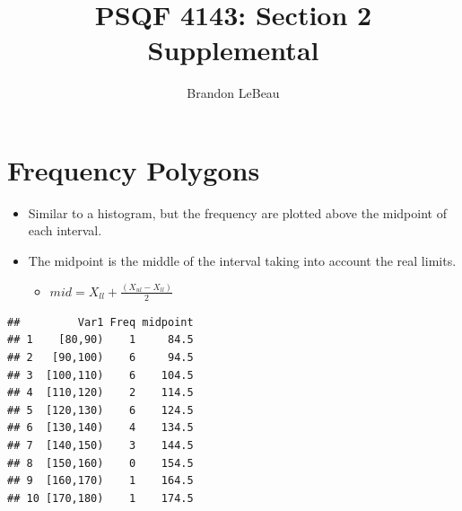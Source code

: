 \documentclass[12pt]{article}
\title{PSQF 4143: Section 2 Supplemental}
\author{Brandon LeBeau}
\date{}
\begin{document}
\maketitle

\section{Frequency Polygons}\label{frequency-polygons}

\begin{itemize}
\itemsep1pt\parskip0pt
\item
  Similar to a histogram, but the frequency are plotted above the
  midpoint of each interval.
\item
  The midpoint is the middle of the interval taking into account the
  real limits.

  \begin{itemize}
  \itemsep1pt\parskip0pt
  \item
    \(mid = X_{ll} + \frac{(X_{ul} - X_{ll})}{2}\)
  \end{itemize}
\end{itemize}

\begin{verbatim}
##         Var1 Freq midpoint
## 1    [80,90)    1     84.5
## 2   [90,100)    6     94.5
## 3  [100,110)    6    104.5
## 4  [110,120)    2    114.5
## 5  [120,130)    6    124.5
## 6  [130,140)    4    134.5
## 7  [140,150)    3    144.5
## 8  [150,160)    0    154.5
## 9  [160,170)    1    164.5
## 10 [170,180)    1    174.5
\end{verbatim}
\end{document}
